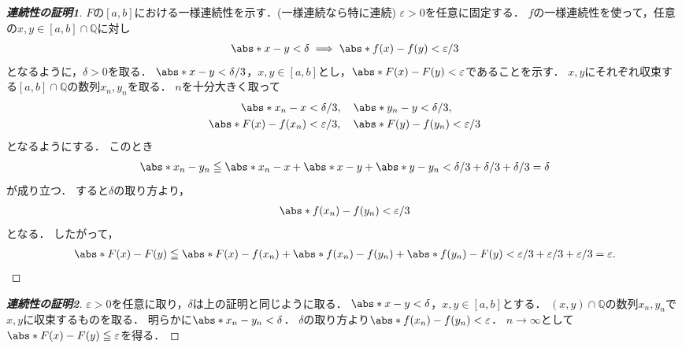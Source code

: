 \documentclass[a4paper,10pt,fleqn]{ltjsarticle}
\begin{document}
    \begin{leftbar}
    \begin{proof}[\textup{\textbf{連続性の証明1}}]
      $F$の$[a,b]$における一様連続性を示す．(一様連続なら特に連続)
      $\varepsilon >0$を任意に固定する．
      $f$の一様連続性を使って，任意の$x,y \in [a,b] \cap \mathbb{Q}$に対し
      \begin{align*}
        \abs*{x-y} < \delta \implies \abs*{f(x) - f(y)} < \varepsilon/3
      \end{align*}
      となるように，$\delta > 0$を取る．
      $\abs*{x-y} < \delta/3$，$x,y \in [a,b]$とし，$\abs*{F(x)-F(y)} < \varepsilon$であることを示す．
      $x,y$にそれぞれ収束する$[a,b] \cap \mathbb{Q}$の数列$x_n,y_n$を取る．
      $n$を十分大きく取って
      \begin{align*}
        \abs*{x_n-x} &< \delta/3, \quad \abs*{y_n-y} < \delta/3, \\
        \abs*{F(x)-f(x_n)} &< \varepsilon/3, \quad \abs*{F(y)-f(y_n)} < \varepsilon/3
      \end{align*}
      となるようにする．
      このとき
      \begin{align*}
        \abs*{x_n-y_n} \le \abs*{x_n-x} + \abs*{x-y} + \abs*{y-y_n} < \delta/3 + \delta/3 + \delta/3 = \delta
      \end{align*}
      が成り立つ．
      すると$\delta$の取り方より，
      \begin{align*}
        \abs*{f(x_n)-f(y_n)} < \varepsilon/3 
      \end{align*}
      となる．
      したがって，
      \begin{align*}
        \abs*{F(x)-F(y)} \le \abs*{F(x)-f(x_n)} + \abs*{f(x_n)-f(y_n)} + \abs*{f(y_n)-F(y)}
        < \varepsilon/3 + \varepsilon/3 + \varepsilon/3 = \varepsilon.
      \end{align*}
    \end{proof}
    \end{leftbar}

    \begin{leftbar}
    \begin{proof}[\textup{\textbf{連続性の証明2}}]
        $\varepsilon>0$を任意に取り，$\delta$は上の証明と同じように取る．
        $\abs*{x-y} < \delta$，$x,y \in [a,b]$とする．
        $(x,y) \cap \mathbb{Q}$の数列$x_n,y_n$で$x,y$に収束するものを取る．
        明らかに$\abs*{x_n-y_n}<\delta$．
        $\delta$の取り方より$\abs*{f(x_n)-f(y_n)}<\varepsilon$．
        $n \to \infty$として$\abs*{F(x)-F(y)} \le \varepsilon$を得る．
      \end{proof}
    \end{leftbar}
    \newpage 
\end{document}
